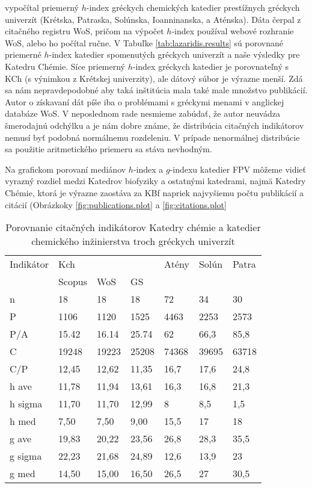 \citet{Lazaridis2010} vypočítal priemerný $h$-index gréckych chemických
katedier prestížnych gréckych univerzít (Krétska, Patraska, Solúnska,
Ioanninanska, a Aténska).  Dáta čerpal z citačného registru WoS, pričom na
výpočet $h$-index používal webové rozhranie WoS, alebo ho počítal ručne. V
Tabuľke \ref{tab:lazaridis.results} sú porovnané priemerné $h$-index katedier
spomenutých gréckych univerzít a naše výsledky pre Katedru Chémie. Síce
priemerný $h$-index gréckych katedier je porovnateľný s KCh (s výnimkou z
Krétskej univerzity), ale dátový súbor je výrazne menší. Zdá sa nám
nepravdepodobné aby taká inštitúcia mala také male množstvo publikácií.  Autor
o získavaní dát píše iba o problémami s gréckymi menami v anglickej databáze
WoS. V neposlednom rade nesmieme zabúdať, že autor neuvádza šmerodajnú odchýlku
a je nám dobre známe, že distribúcia citačných indikátorov nemusí byť podobná
normálnemu rozdeleniu. V prípade nenormálnej distribúcie sa použitie
aritmetického priemeru sa stáva nevhodným.

Na grafickom porovaní mediánov $h$-index a $g$-indexu katedier FPV môžeme vidieť
vyrazný rozdiel medzi Katedrov biofyziky a ostatnými katedrami, najmä Katedry 
Chémie, ktorá je výrazne zaostáva za KBf napriek najvyšiemu počtu publikácií
a citácií (Obrázkoky \ref{fig:publications.plot} a \ref{fig:citations.plot}


\begin{table}
  \label{tab:kazakis.results}
  \caption[Porovnanie Katedry chémie a katedier chemického inžinierstva troch gréckych univerzít]
  {Porovnanie citačných indikátorov Katedry chémie a katedier chemického inžinierstva troch gréckych univerzít \citep{Kazakis2015}}
\begin{tabular}{lllllll}
\hline
 Indikátor & Kch    &       &       & Atény & Solún & Patra \\
           & Scopus & WoS   & GS    &       &       &       \\
 n         & 18     & 18    & 18    & 72    & 34    & 30    \\
 P         & 1106   & 1120  & 1525  & 4463  & 2253  & 2573  \\
 P/A       & 15.42  & 16.14 & 25.74 & 62    & 66,3  & 85,8  \\
 C         & 19248  & 19223 & 25208 & 74368 & 39695 & 63718 \\
 C/P       & 12,45  & 12,62 & 11,35 & 16,7  & 17,6  & 24,8  \\
 h ave     & 11,78  & 11,94 & 13,61 & 16,3  & 16,8  & 21,3  \\
 h sigma   & 11,70  & 11,70 & 12,99 & 8     & 8,5   & 1,5   \\
 h med     & 7,50   & 7,50  & 9,00  & 15,5  & 17    & 18    \\
 g ave     & 19,83  & 20,22 & 23,56 & 26,8  & 28,3  & 35,5  \\
 g sigma   & 22,23  & 21,68 & 24,89 & 12,6  & 13,9  & 23    \\
 g med     & 14,50  & 15,00 & 16,50 & 26,5  & 27    & 30,5  \\
\hline
\end{tabular}
\end{table}

